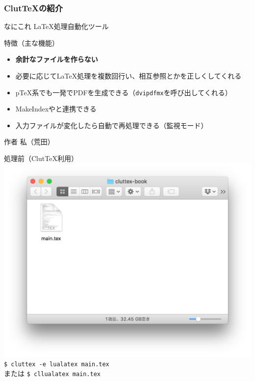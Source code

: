 \documentclass[aspectratio=169]{beamer}
\begin{document}
\begin{frame}\frametitle{Clut\TeX の紹介}
  \begin{block}{なにこれ}
    \LaTeX 処理自動化ツール
  \end{block}

  \begin{block}{特徴（主な機能）}
    \begin{itemize}
    \item {\bfseries 余計なファイルを作らない}
    \item 必要に応じて\LaTeX{}処理を複数回行い、相互参照とかを正しくしてくれる
    \item p\TeX{}系でも一発でPDFを生成できる（\texttt{dvipdfmx}を呼び出してくれる）
    \item MakeIndexや\BibTeX と連携できる
    \item 入力ファイルが変化したら自動で再処理できる（監視モード）
    \end{itemize}
  \end{block}

  \begin{block}{作者}
    私（荒田）
  \end{block}
\end{frame}
\begin{frame}[plain]
  \begin{block}{処理前（Clut\TeX{}利用）}
    \centering
    \includegraphics[height=0.6\paperheight]{latex-before.png}\\
    \texttt{\$ cluttex -e lualatex main.tex}\\
    または \texttt{\$ cllualatex main.tex}
  \end{block}
\end{frame}
\end{document}
